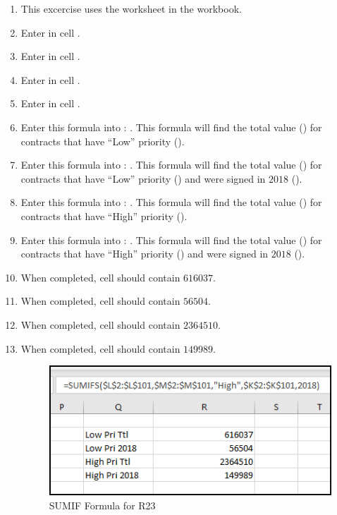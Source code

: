 \begin{enumerate}
	\item This excercise uses the  worksheet in the  workbook.
	\item Enter  in cell .
	\item Enter  in cell .
	\item Enter  in cell .
	\item Enter  in cell .
	\item Enter this formula into : . This formula will find the total value () for contracts that have ``Low'' priority ().
	\item Enter this formula into : . This formula will find the total value () for contracts that have ``Low'' priority () and were signed in $ 2018 $ ().
	\item Enter this formula into : . This formula will find the total value () for contracts that have ``High'' priority ().
	\item Enter this formula into : . This formula will find the total value () for contracts that have ``High'' priority () and were signed in $ 2018 $ ().
	\item When completed, cell  should contain $ 616037 $.
	\item When completed, cell  should contain $ 56504 $.
	\item When completed, cell  should contain $ 2364510 $.
	\item When completed, cell  should contain $ 149989 $.
	
	\begin{figure}[H]
		\centering
		\includegraphics[width=\maxwidth{.95\linewidth}]{gfx/ch09_fig42}
		\caption{SUMIF Formula for R23}
		\label{09:fig42}
	\end{figure}
	
\end{enumerate}

